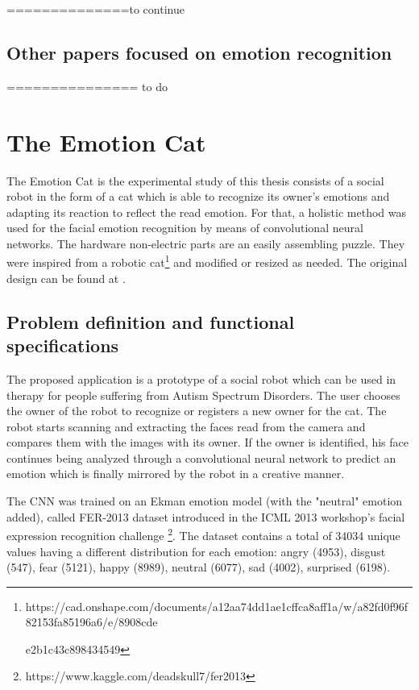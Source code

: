 \documentclass[runningheads,a4paper,12pt]{report}
\begin{document}
==============to continue 

\section{Other papers focused on emotion recognition}

=============== to do

\chapter{The Emotion Cat}
\label{chapter:robot}

The Emotion Cat is the experimental study of this thesis consists of a social robot in the form of a cat which is able to recognize its owner's emotions and adapting its reaction to reflect the read emotion. For that, a holistic method was used for the facial emotion recognition by means of convolutional neural networks. The hardware non-electric parts are an easily assembling puzzle. They were inspired from a robotic cat\footnote{https://cad.onshape.com/documents/a12aa74dd1ae1cffca8aff1a/w/a82fd0f96f82153fa85196a6/e/8908cde

e2b1c43c898434549} and modified or resized as needed. The original design can be found at \cite{nybble}.

\section{Problem definition and functional specifications}
\label{chapter:definition}
The proposed application is a prototype of a social robot which can be used in therapy for people suffering from Autism Spectrum Disorders. The user chooses the owner of the robot to recognize or registers a new owner for the cat. The robot starts scanning and extracting the faces read from the camera and compares them with the images with its owner. If the owner is identified, his face continues being analyzed through a convolutional neural network to predict an emotion which is finally mirrored by the robot in a creative manner. 

The CNN was trained on an Ekman emotion model (with the "neutral" emotion added), called FER-2013 dataset introduced in the ICML 2013 workshop's facial expression recognition challenge \footnote{https://www.kaggle.com/deadskull7/fer2013}. The dataset contains a total of 34034 unique values having a different distribution for each emotion: angry (4953), disgust (547), fear (5121), happy (8989), neutral (6077), sad (4002), surprised (6198). 
\end{document}
